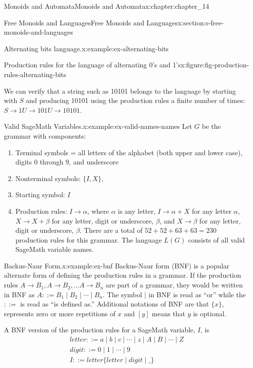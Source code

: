\documentclass[twoside,10pt,]{book}
\numberwithin{equation}{section}
\begin{document}
\begin{chapterptx}{Monoids and Automata}{}{Monoids and Automata}{}{}{x:chapter:chapter_14}
\begin{sectionptx}{Free Monoids and Languages}{}{Free Monoids and Languages}{}{}{x:section:s-free-monoids-and-languages}
\begin{example}{Alternating bits language.}{x:example:ex-alternating-bits}
\begin{figureptx}{Production rules for the language of alternating 0's and 1's}{x:figure:fig-production-rules-alternating-bits}{}
\begin{image}{0.15}{0.7}{0.15}
\end{image}%
\tcblower
\end{figureptx}%
We can verify that a string such as 10101 belongs to the language by starting with \(S\) and producing 10101 using the production rules a finite number of times: \(S\to 1U\to 101U\to 10101\).%
\end{example}
\begin{example}{Valid SageMath Variables.}{x:example:ex-valid-names-names}%
Let \(G\) be the grammar with components:%
\begin{enumerate}[label=(\arabic*)]
\item{}Terminal symbols = all letters of the alphabet (both upper and lower case), digits 0 through 9, and underscore%
\item{}Nonterminal symbols: \(\{I, X\}\),%
\item{}Starting symbol: \(I\)%
\item{}Production rules: \(I \to \alpha\), where \(\alpha\) is any letter, \(I \to \alpha+X\) for any letter \(\alpha\), \(X\to X+\beta\) for any letter, digit or underscore, \(\beta\), and \(X \to \beta\) for any letter, digit or underscore, \(\beta\). There are a total of \(52+52+63+63=230\) production rules for this grammar. The language \(L(G)\) consists of all valid SageMath variable names.%
\end{enumerate}
%
\end{example}
\begin{example}{Backus-Naur Form.}{x:example:ex-bnf}%
Backus-Naur form (BNF) is a popular alternate form of defining the production rules in a grammar. If the production rules \(A\to B_1, A\to B_2,\ldots  A\to B_n\) are part of a grammar, they would be written in BNF as \(A ::=B_1 \mid B_2\mid  \cdots \mid  B_n\). The symbol \(\mid\) in BNF is read as ``or'' while the \(::=\) is read as ``is defined as.'' Additional notations of BNF are that \(\{x\}\), represents zero or more repetitions of \(x\) and \([y]\) means that \(y\) is optional.%
\par
A BNF version of the production rules for a SageMath variable, \(I\), is%
\begin{equation*}
\begin{array}{l}
letter ::=a \mid b \mid c \mid \cdots \mid z\mid A\mid  B\mid \cdots \mid Z\\
digit::=0 \mid 1 \mid \cdots  \mid 9\\
I::= letter\{letter  \mid  digit  \mid  \_\}\\
\\

\end{array}
\end{equation*}
\end{example}
\end{sectionptx}
\end{chapterptx}
\end{document}
